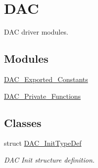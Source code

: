 \hypertarget{group___d_a_c}{}\section{D\+AC}
\label{group___d_a_c}


D\+AC driver modules.  


\subsection*{Modules}
\begin{DoxyCompactItemize}
\item 
\hyperlink{group___d_a_c___exported___constants}{D\+A\+C\+\_\+\+Exported\+\_\+\+Constants}
\item 
\hyperlink{group___d_a_c___private___functions}{D\+A\+C\+\_\+\+Private\+\_\+\+Functions}
\end{DoxyCompactItemize}
\subsection*{Classes}
\begin{DoxyCompactItemize}
\item 
struct \hyperlink{struct_d_a_c___init_type_def}{D\+A\+C\+\_\+\+Init\+Type\+Def}
\begin{DoxyCompactList}\small\item\em D\+AC Init structure definition. \end{DoxyCompactList}\end{DoxyCompactItemize}
